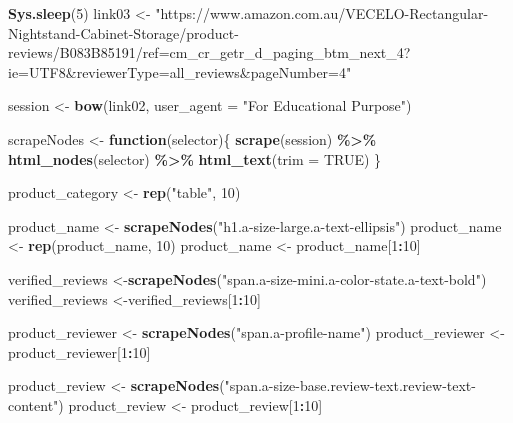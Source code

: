\documentclass[
]{article}
\newenvironment{Shaded}{\begin{snugshade}}{\end{snugshade}}
\newcommand{\AttributeTok}[1]{\textcolor[rgb]{0.13,0.29,0.53}{#1}}
\newcommand{\ConstantTok}[1]{\textcolor[rgb]{0.56,0.35,0.01}{#1}}
\newcommand{\ControlFlowTok}[1]{\textcolor[rgb]{0.13,0.29,0.53}{\textbf{#1}}}
\newcommand{\DecValTok}[1]{\textcolor[rgb]{0.00,0.00,0.81}{#1}}
\newcommand{\FunctionTok}[1]{\textcolor[rgb]{0.13,0.29,0.53}{\textbf{#1}}}
\newcommand{\NormalTok}[1]{#1}
\newcommand{\OtherTok}[1]{\textcolor[rgb]{0.56,0.35,0.01}{#1}}
\newcommand{\SpecialCharTok}[1]{\textcolor[rgb]{0.81,0.36,0.00}{\textbf{#1}}}
\newcommand{\StringTok}[1]{\textcolor[rgb]{0.31,0.60,0.02}{#1}}
\begin{document}
\begin{Shaded}
\begin{Highlighting}[]
   \FunctionTok{Sys.sleep}\NormalTok{(}\DecValTok{5}\NormalTok{)}
\NormalTok{link03 }\OtherTok{\textless{}{-}} \StringTok{"https://www.amazon.com.au/VECELO{-}Rectangular{-}Nightstand{-}Cabinet{-}Storage/product{-}reviews/B083B85191/ref=cm\_cr\_getr\_d\_paging\_btm\_next\_4?ie=UTF8\&reviewerType=all\_reviews\&pageNumber=4"}


\NormalTok{  session }\OtherTok{\textless{}{-}} \FunctionTok{bow}\NormalTok{(link02,}
               \AttributeTok{user\_agent =} \StringTok{"For Educational Purpose"}\NormalTok{)}

\NormalTok{  scrapeNodes }\OtherTok{\textless{}{-}} \ControlFlowTok{function}\NormalTok{(selector)\{}
    \FunctionTok{scrape}\NormalTok{(session) }\SpecialCharTok{\%\textgreater{}\%}
      \FunctionTok{html\_nodes}\NormalTok{(selector) }\SpecialCharTok{\%\textgreater{}\%}
      \FunctionTok{html\_text}\NormalTok{(}\AttributeTok{trim =} \ConstantTok{TRUE}\NormalTok{)}
\NormalTok{  \}}

\NormalTok{  product\_category }\OtherTok{\textless{}{-}} \FunctionTok{rep}\NormalTok{(}\StringTok{"table"}\NormalTok{, }\DecValTok{10}\NormalTok{)}

\NormalTok{  product\_name }\OtherTok{\textless{}{-}} \FunctionTok{scrapeNodes}\NormalTok{(}\StringTok{"h1.a{-}size{-}large.a{-}text{-}ellipsis"}\NormalTok{)}
\NormalTok{  product\_name }\OtherTok{\textless{}{-}} \FunctionTok{rep}\NormalTok{(product\_name, }\DecValTok{10}\NormalTok{)}
\NormalTok{  product\_name }\OtherTok{\textless{}{-}}\NormalTok{ product\_name[}\DecValTok{1}\SpecialCharTok{:}\DecValTok{10}\NormalTok{]}
  
\NormalTok{  verified\_reviews }\OtherTok{\textless{}{-}}\FunctionTok{scrapeNodes}\NormalTok{(}\StringTok{"span.a{-}size{-}mini.a{-}color{-}state.a{-}text{-}bold"}\NormalTok{)}
\NormalTok{  verified\_reviews }\OtherTok{\textless{}{-}}\NormalTok{verified\_reviews[}\DecValTok{1}\SpecialCharTok{:}\DecValTok{10}\NormalTok{]}
  
\NormalTok{  product\_reviewer }\OtherTok{\textless{}{-}} \FunctionTok{scrapeNodes}\NormalTok{(}\StringTok{"span.a{-}profile{-}name"}\NormalTok{)}
\NormalTok{  product\_reviewer }\OtherTok{\textless{}{-}}\NormalTok{ product\_reviewer[}\DecValTok{1}\SpecialCharTok{:}\DecValTok{10}\NormalTok{]}
  
\NormalTok{  product\_review }\OtherTok{\textless{}{-}} \FunctionTok{scrapeNodes}\NormalTok{(}\StringTok{"span.a{-}size{-}base.review{-}text.review{-}text{-}content"}\NormalTok{)}
\NormalTok{  product\_review }\OtherTok{\textless{}{-}}\NormalTok{ product\_review[}\DecValTok{1}\SpecialCharTok{:}\DecValTok{10}\NormalTok{]}
  

\end{Highlighting}
\end{Shaded}
\end{document}

